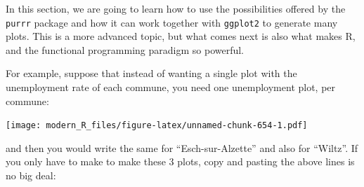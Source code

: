 \documentclass[]{gitbook}
\newenvironment{Shaded}{\begin{snugshade}}{\end{snugshade}}
\newcommand{\DataTypeTok}[1]{\textcolor[rgb]{0.13,0.29,0.53}{#1}}
\newcommand{\KeywordTok}[1]{\textcolor[rgb]{0.13,0.29,0.53}{\textbf{#1}}}
\newcommand{\NormalTok}[1]{#1}
\newcommand{\OperatorTok}[1]{\textcolor[rgb]{0.81,0.36,0.00}{\textbf{#1}}}
\newcommand{\StringTok}[1]{\textcolor[rgb]{0.31,0.60,0.02}{#1}}
\begin{document}
In this section, we are going to learn how to use the possibilities offered by the \texttt{purrr} package
and how it can work together with \texttt{ggplot2} to generate many plots. This is a more advanced topic,
but what comes next is also what makes R, and the functional programming paradigm so powerful.

For example, suppose that instead of wanting a single plot with the unemployment rate of each
commune, you need one unemployment plot, per commune:

\begin{Shaded}
\end{Shaded}

\texttt{[image: modern\_R\_files/figure-latex/unnamed-chunk-654-1.pdf]}

and then you would write the same for ``Esch-sur-Alzette'' and also for ``Wiltz''. If you only have to
make to make these 3 plots, copy and pasting the above lines is no big deal:

\begin{Shaded}
\end{Shaded}
\end{document}
